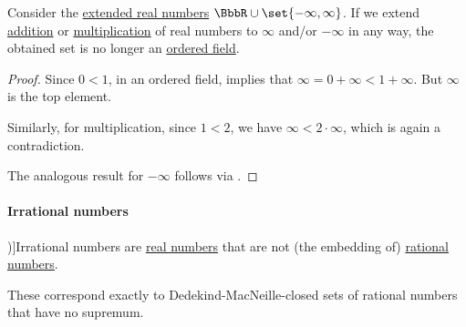 \begin{proposition}\label{thm:extended_real_numbers_are_not_field}
  Consider the \hyperref[def:extended_real_numbers]{extended real numbers} \( \BbbR \cup \set{ -\infty, \infty } \). If we extend \hyperref[def:real_number_arithmetic/addition]{addition} or \hyperref[def:real_number_arithmetic/multiplication]{multiplication} of real numbers to \( \infty \) and/or \( -\infty \) in any way, the obtained set is no longer an \hyperref[def:ordered_semiring]{ordered field}.
\end{proposition}
\begin{proof}
  Since \( 0 < 1 \), in an ordered field,  implies that \( \infty = 0 + \infty < 1 + \infty \). But \( \infty \) is the top element.

  Similarly, for multiplication, since \( 1 < 2 \), we have \( \infty < 2 \cdot \infty \), which is again a contradiction.

  The analogous result for \( -\infty \) follows via .
\end{proof}

\paragraph{Irrational numbers}

\begin{definition}\label{def:irrational_numbers}\mimprovised
  \term[ru=иррациональные числа (\cite[36]{Александров1977Введение})]{Irrational numbers} are \hyperref[def:real_numbers]{real numbers} that are not (the embedding of) \hyperref[def:rational_numbers]{rational numbers}.
\end{definition}
\begin{comments}
  \item These correspond exactly to Dedekind-MacNeille-closed sets of rational numbers that have no supremum.
\end{comments}

